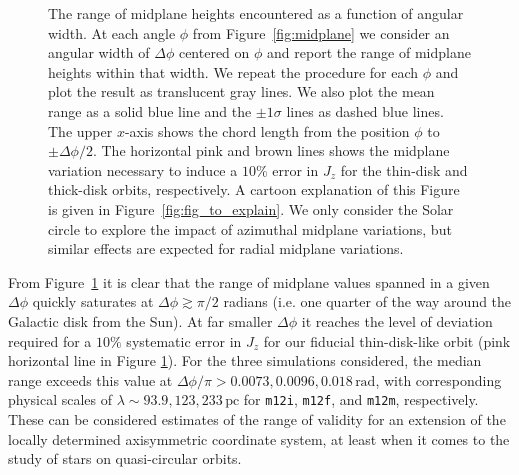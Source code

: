 \documentclass[twocolumn]{aastex62}
\newcommand{\pc}{\text{pc}}
\newcommand{\mi}{\texttt{m12i}}
\newcommand{\mf}{\texttt{m12f}}
\newcommand{\mm}{\texttt{m12m}}
\newcommand{\thincolor}{pink}
\newcommand{\thickcolor}{brown}
\begin{document}
\begin{figure}
\caption{The range of midplane heights encountered as a function of angular
width. At each angle $\phi$ from Figure~\ref{fig:midplane} we consider an
angular width of $\Delta \phi$ centered on $\phi$ and report the range of
midplane heights within that width. We repeat the procedure for each $\phi$
and plot the result as translucent gray lines. We also plot the mean range as
a solid blue line and the $\pm1\sigma$ lines as dashed blue lines. The upper
$x$-axis shows the chord length from the position $\phi$ to $\pm\Delta\phi/2$.
The horizontal \thincolor{} and \thickcolor{} lines shows the midplane
variation necessary to induce a $10\%$ error in $J_z$ for the thin-disk and
thick-disk orbits, respectively. A cartoon explanation of this Figure is given
in Figure~\ref{fig:fig_to_explain}. We only consider the Solar circle to
explore the impact of azimuthal midplane variations, but similar effects are
expected for radial midplane variations.}
\label{fig:range_deltaphi}
\end{figure}

From Figure~\ref{fig:range_deltaphi} it is clear that the range of midplane
values spanned in a given $\Delta \phi$ quickly saturates at $\Delta \phi
\gtrsim \pi/2$ radians (i.e. one quarter of the way around the Galactic disk
from the Sun). At far smaller $\Delta \phi$ it reaches the level of deviation
required for a $10\%$ systematic error in $J_z$ for our fiducial
thin-disk-like orbit (\thincolor{} horizontal line in Figure
\ref{fig:range_deltaphi}). For the three simulations considered, the median
range exceeds this value at $\Delta \phi/\pi > 0.0073, 0.0096,
0.018\,\text{rad}$, with corresponding physical scales of $\lambda \sim 93.9,
123, 233\,\pc$ for \mi{}, \mf{}, and \mm{}, respectively. These can be
considered estimates of the range of validity for an extension of the locally
determined axisymmetric coordinate system, at least when it comes to the study
of stars on quasi-circular orbits.
\end{document}
